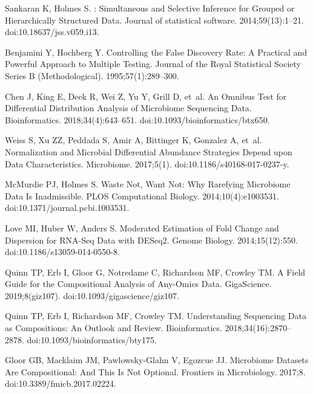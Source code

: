\documentclass[10pt,letterpaper]{article}
\begin{document}
\begin{thebibliography}{10}
Sankaran K, Holmes S.
: {{Simultaneous}} and {{Selective Inference}} for
  {{Grouped}} or {{Hierarchically Structured Data}}.
\newblock Journal of statistical software. 2014;59(13):1--21.
\newblock doi:{10.18637/jss.v059.i13}.

Benjamini Y, Hochberg Y.
\newblock Controlling the {{False Discovery Rate}}: {{A Practical}} and
  {{Powerful Approach}} to {{Multiple Testing}}.
\newblock Journal of the Royal Statistical Society Series B (Methodological).
  1995;57(1):289--300.

Chen J, King E, Deek R, Wei Z, Yu Y, Grill D, et~al.
\newblock An Omnibus Test for Differential Distribution Analysis of Microbiome
  Sequencing Data.
\newblock Bioinformatics. 2018;34(4):643--651.
\newblock doi:{10.1093/bioinformatics/btx650}.

Weiss S, Xu ZZ, Peddada S, Amir A, Bittinger K, Gonzalez A, et~al.
\newblock Normalization and Microbial Differential Abundance Strategies Depend
  upon Data Characteristics.
\newblock Microbiome. 2017;5(1).
\newblock doi:{10.1186/s40168-017-0237-y}.

McMurdie PJ, Holmes S.
\newblock Waste {{Not}}, {{Want Not}}: {{Why Rarefying Microbiome Data Is
  Inadmissible}}.
\newblock PLOS Computational Biology. 2014;10(4):e1003531.
\newblock doi:{10.1371/journal.pcbi.1003531}.

Love MI, Huber W, Anders S.
\newblock Moderated Estimation of Fold Change and Dispersion for {{RNA}}-Seq
  Data with {{DESeq2}}.
\newblock Genome Biology. 2014;15(12):550.
\newblock doi:{10.1186/s13059-014-0550-8}.

Quinn TP, Erb I, Gloor G, Notredame C, Richardson MF, Crowley TM.
\newblock A Field Guide for the Compositional Analysis of Any-Omics Data.
\newblock GigaScience. 2019;8(giz107).
\newblock doi:{10.1093/gigascience/giz107}.

Quinn TP, Erb I, Richardson MF, Crowley TM.
\newblock Understanding Sequencing Data as Compositions: An Outlook and Review.
\newblock Bioinformatics. 2018;34(16):2870--2878.
\newblock doi:{10.1093/bioinformatics/bty175}.

Gloor GB, Macklaim JM, {Pawlowsky-Glahn} V, Egozcue JJ.
\newblock Microbiome {{Datasets Are Compositional}}: {{And This Is Not
  Optional}}.
\newblock Frontiers in Microbiology. 2017;8.
\newblock doi:{10.3389/fmicb.2017.02224}.


\end{thebibliography}
\end{document}
